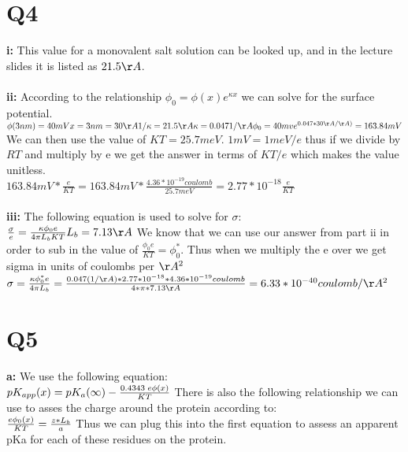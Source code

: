 \documentclass[12pt]{article}
\begin{document}
\section{Q4}
\textbf{i: } This value for a monovalent salt solution can be looked up, and in the lecture slides it is listed as $21.5\AA$. \\\\
\textbf{ii: } According to the relationship $\phi_0 = \phi(x)e^{\kappa x}$ we can solve for the surface potential.\\
$\phi(3nm) = 40 mV\\
x = 3nm = 30\AA\\
1/\kappa = 21.5\AA\\
\kappa = 0.047 1/\AA\\
\phi_0 = 40 mv e^{0.047 * 30 \AA/\AA)} = 163.84 mV\\$
We can then use the value of $KT = 25.7 meV$. $1mV = 1 meV/e$ thus if we divide by $RT$ and multiply by e we get the answer in terms of $KT/e$ which makes the value unitless.\\ 
$163.84 mV * \frac{e}{KT} = 163.84 mV * \frac{4.36*10^{-19}coulomb}{25.7 meV} = 2.77*10^{-18} \frac{e}{KT} $ 
\\\\
\noindent\textbf{iii: } The following equation is used to solve for $\sigma$:\\
$
\frac{\sigma}{e} = \frac{\kappa \phi_0 e}{4\pi L_b KT}\\
L_b = 7.13\AA\\
$
We know that we can use our answer from part ii in order to sub in the value of $\frac{\phi_0 e}{KT} = \phi_0^*$. Thus when we multiply the e over we get sigma in units of coulombs per $\AA^2$
$
\sigma = \frac{\kappa \phi_0^* e}{4\pi L_b} = \frac{0.047 (1/\AA) * 2.77*10^{-18} * 4.36*10^{-19}coulomb}{4*\pi*7.13\AA} = 6.33 * 10^{-40} coulomb/\AA ^2\\$

\section{Q5}
\textbf{a: } We use the following equation:\\
$
pK_{app}(x) = pK_a(\infty) - \frac{0.4343\;e\phi(x)}{KT} \\
$
There is also the following relationship we can use to asses the charge around the protein according to:\\
$
\frac{e\phi_0(x)}{KT} = \frac{z*L_b}{a}\\
$
Thus we can plug this into the first equation to assess an apparent pKa for each of these residues on the protein.\\\\
\end{document}
